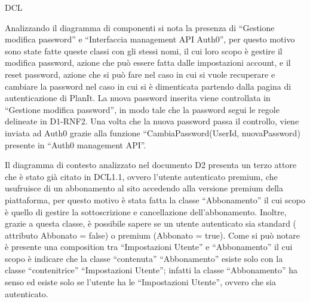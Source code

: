 \begin{listaPersonale}{DCL}
    
        \begin{center}
            
        \end{center}
    
        

    \begin{listaPersonale2}[DCL]{}

        Analizzando il diagramma di componenti si nota la presenza di “Gestione modifica password” e “Interfaccia management API Auth0”, per questo motivo sono state fatte queste classi con gli stessi nomi, il cui loro scopo è gestire il modifica password, azione che può essere fatta dalle impostazioni account, e il reset password, azione che si può fare nel caso in cui si vuole recuperare e cambiare la password nel caso in cui si è dimenticata partendo dalla pagina di autenticazione di PlanIt. La nuova password inserita viene controllata in “Gestione modifica password”, in modo tale che la password segui le regole delineate in D1-RNF2. Una volta che la nuova password passa il controllo, viene inviata ad Auth0 grazie alla funzione “CambiaPassword(UserId, nuovaPassword) presente in “Auth0 management API”.
        
        
            \begin{center}
                
            \end{center}
        
            

        Il diagramma di contesto analizzato nel documento D2 presenta un terzo attore che è stato già citato in DCL1.1, ovvero l'utente autenticato premium, che usufruisce di un abbonamento al sito accedendo alla versione premium della piattaforma, per questo motivo è stata fatta la classe “Abbonamento” il cui scopo è quello di gestire la sottoscrizione e cancellazione dell'abbonamento. Inoltre, grazie a questa classe, è possibile sapere se un utente autenticato sia standard ( attributo Abbonato = false) o premium (Abbonato = true). Come si può notare è presente una composition tra “Impostazioni Utente” e “Abbonamento” il cui scopo è indicare che la classe “contenuta” “Abbonamento” esiste solo con la classe “contenitrice” “Impostazioni Utente”; infatti la classe “Abbonamento” ha senso ed esiste solo se l'utente ha le “Impostazioni Utente”, ovvero che sia autenticato.
        

\end{listaPersonale2}
\end{listaPersonale}
